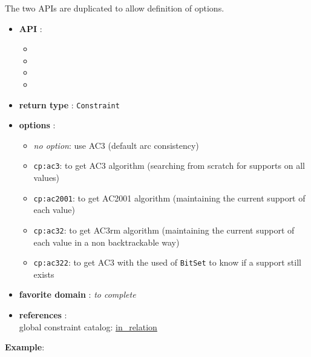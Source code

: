 The two APIs are duplicated to allow definition of options. 
\begin{itemize}
	\item \textbf{API} :
	\begin{itemize}
		\item {}
		\item {}
		\item {}
		\item {}
	\end{itemize}
	\item \textbf{return type} : \texttt{Constraint}
	\item \textbf{options} :
	\begin{itemize}
		\item \emph{no option}: use AC3 (default arc consistency)
		\item \texttt{cp:ac3}: to get AC3 algorithm (searching from scratch for supports on all values)
		\item \texttt{cp:ac2001}: to get AC2001 algorithm (maintaining the current support of each value)
		\item \texttt{cp:ac32}: to get AC3rm algorithm (maintaining the current support of each value in a non backtrackable way)
		\item \texttt{cp:ac322}: to get AC3 with the used of \texttt{BitSet} to know if a support still exists
	\end{itemize}
	\item \textbf{favorite domain} : \emph{to complete}
	\item \textbf{references} :\\
      global constraint catalog: \href{http://www.emn.fr/x-info/sdemasse/gccat/Cin_relation.html}{in\_relation}
\end{itemize}



\textbf{Example}:
 
